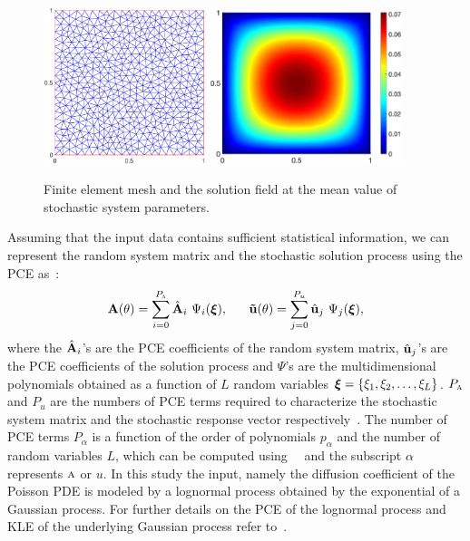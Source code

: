 \documentclass[letter,1p,11pt,oneside,onecolumn,sort&compress]{elsarticle}
\begin{document}
\begin{figure}[htbp]
\centering
 \includegraphics[width=0.42\textwidth,height=0.27\textheight]{plots/apn_mesh.eps}
 \includegraphics[width=0.5\textwidth,height=0.27\textheight]{plots/apn_mean_solution.eps}
 \caption{Finite element mesh and the solution field at the mean value of stochastic system parameters.}
 \label{fig:mean_SSFEM}
\end{figure}

Assuming that the input data contains sufficient statistical information, we can represent the random system matrix and the stochastic solution process using the PCE as~\cite{ghanemSFEM1991}:
\begin{align}
{\mathrm{\bf{A}(\theta)}} =  \sum^{P_{\textsc{a}}}_{i=0} {\hat{{\mathrm{\bf{A}}}}_i} \ {\Psi_i(\bxi)},  \ \ \ \ \  {\mathrm{\bf{\tilde{u}}(\theta)}} =  \sum^{P_{u}}_{j=0} {\mathrm{\hat{\bf{u}}}_j}  \ {\Psi_j(\bxi)},
\label{eq:pceinout}
\end{align}
where the $\hat{{\mathrm{\bf{A}}}}_i$'s are the PCE coefficients of the random system matrix, $\hat{{\bf{u}}}_j$'s are the PCE coefficients of the solution process and $\Psi$'s are the multidimensional polynomials obtained as a function of $L$ random variables ${\mbox{\boldmath $\xi$}} = \{ \xi_{1}, \xi_{2}, \dots, \xi_{L} \}$.
$P_{\textsc{a}}$ and $P_{u}$ are the numbers of PCE terms required to characterize the stochastic system matrix and the stochastic response vector respectively~\cite{ghanemSFEM1991}.
The number of PCE terms $P_{\alpha}$ is a function of the order of polynomials $p_{\alpha}$ and the number of random variables $L$, which can be computed using~~\cite{ghanemSFEM1991} and the subscript $\alpha$ represents $\textsc{a}$ or $u$. In this study the input, namely the diffusion coefficient of the Poisson PDE is modeled by a lognormal process obtained by the exponential of a Gaussian process.  For further details on the PCE of the lognormal process and KLE of the underlying Gaussian process refer to~\cite{desai2019scalable}.
\end{document}
